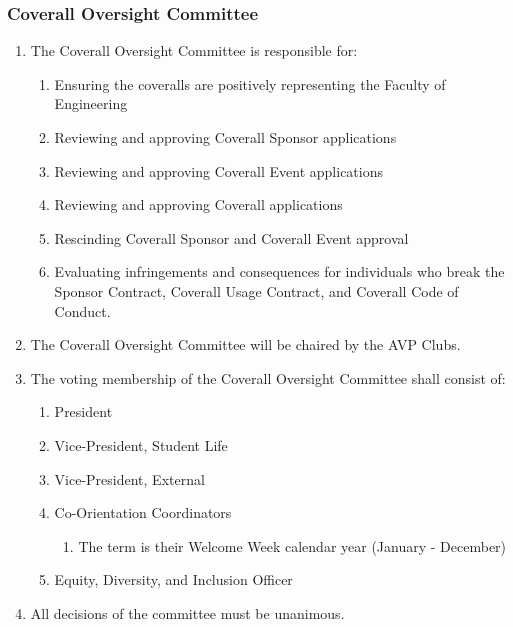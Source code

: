 \subsubsection{Coverall Oversight Committee}
\label{coverall-oversight-committee}

\begin{enumerate}
 \item
  The Coverall Oversight Committee is responsible for:

  \begin{enumerate}
   \item
    Ensuring the coveralls are positively representing the Faculty of
    Engineering
   \item
    Reviewing and approving Coverall Sponsor applications
   \item
    Reviewing and approving Coverall Event applications
   \item
    Reviewing and approving Coverall applications
   \item
    Rescinding Coverall Sponsor and Coverall Event approval
   \item
    Evaluating infringements and consequences for individuals who break
    the Sponsor Contract, Coverall Usage Contract, and Coverall Code of
    Conduct.
  \end{enumerate}
 \item
  The Coverall Oversight Committee will be chaired by the AVP Clubs.
 \item
  The voting membership of the Coverall Oversight Committee shall
  consist of:

  \begin{enumerate}
   \item
    President
   \item
    Vice-President, Student Life
   \item
    Vice-President, External
   \item
    Co-Orientation Coordinators
    \begin{enumerate}
     \item
      The term is their Welcome Week calendar year (January - December)
    \end{enumerate}
   \item
    Equity, Diversity, and Inclusion Officer
  \end{enumerate}
 \item
  All decisions of the committee must be unanimous.
\end{enumerate}

